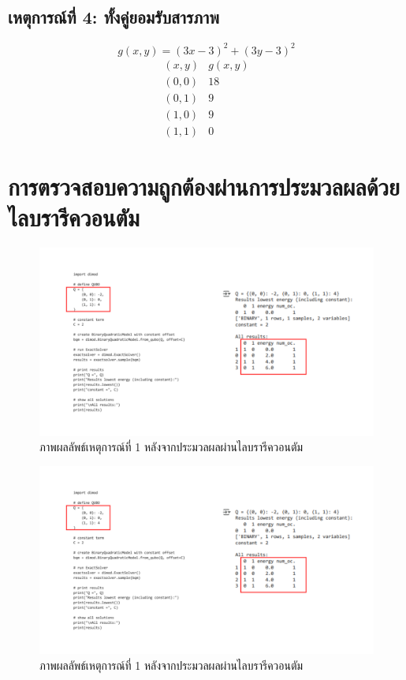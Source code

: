 \subsection{เหตุการณ์ที่ 4: ทั้งคู่ยอมรับสารภาพ}
\[
g(x,y) = (3x-3)^2 + (3y-3)^2
\]
\[
\begin{array}{l|c}
(x,y) & g(x,y) \\ \hline
(0,0) & 18\\
(0,1) & 9\\
(1,0) & 9\\
(1,1) & 0
\end{array}
\]

\section{การตรวจสอบความถูกต้องผ่านการประมวลผลด้วยไลบรารีควอนตัม}
  

  \begin{figure}
  \begin{center}
  \includegraphics[width=5.5in]{case1_RunPicture.png}
  \end{center}
  \caption[Poem]{ภาพผลลัพธ์เหตุการณ์ที่ 1 หลังจากประมวลผลผ่านไลบรารีควอนตัม }
  \end{figure}

  \begin{figure}
    \begin{center}
    \includegraphics[width=5.5in]{case1_RunPicture.png}
    \end{center}
    \caption[Poem]{ภาพผลลัพธ์เหตุการณ์ที่ 1 หลังจากประมวลผลผ่านไลบรารีควอนตัม }
    \end{figure}

